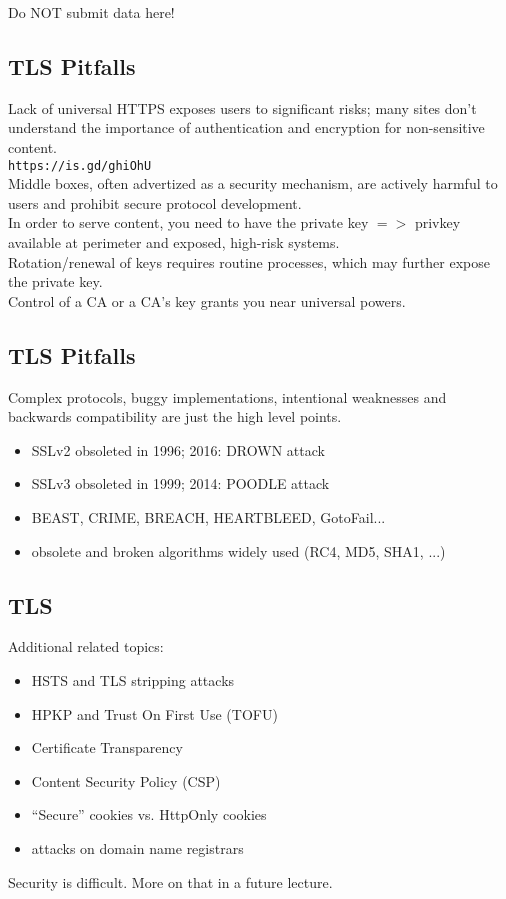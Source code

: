 \documentclass[xga]{xdvislides}
\begin{document}
Do NOT submit data here!


\subsection{TLS Pitfalls}
Lack of universal HTTPS exposes users to significant
risks; many sites don't understand the importance of
authentication and encryption for non-sensitive content. \\

\verb+https://is.gd/ghiOhU+ \\

Middle boxes, often advertized as a security
mechanism, are actively harmful to users and prohibit
secure protocol development. \\

In order to serve content, you need to have the
private key $ => $ privkey available at perimeter and
exposed, high-risk systems. \\

Rotation/renewal of keys requires routine processes,
which may further expose the private key. \\

Control of a CA or a CA's key grants you near
universal powers. \\


\subsection{TLS Pitfalls}
Complex protocols, buggy implementations, intentional
weaknesses and backwards compatibility are just the
high level points.

\begin{itemize}
	\item SSLv2 obsoleted in 1996; 2016: DROWN attack
	\item SSLv3 obsoleted in 1999; 2014: POODLE attack
	\item BEAST, CRIME, BREACH, HEARTBLEED, GotoFail...
	\item obsolete and broken algorithms widely used (RC4, MD5, SHA1, ...)
\end{itemize}

\subsection{TLS}
Additional related topics:
\begin{itemize}
	\item HSTS and TLS stripping attacks
	\item HPKP and Trust On First Use (TOFU)
	\item Certificate Transparency
	\item Content Security Policy (CSP)
	\item ``Secure'' cookies vs. HttpOnly cookies
	\item attacks on domain name registrars
\end{itemize}
\addvspace{.5in}
Security is difficult.  More on that in a future
lecture.
\end{document}
